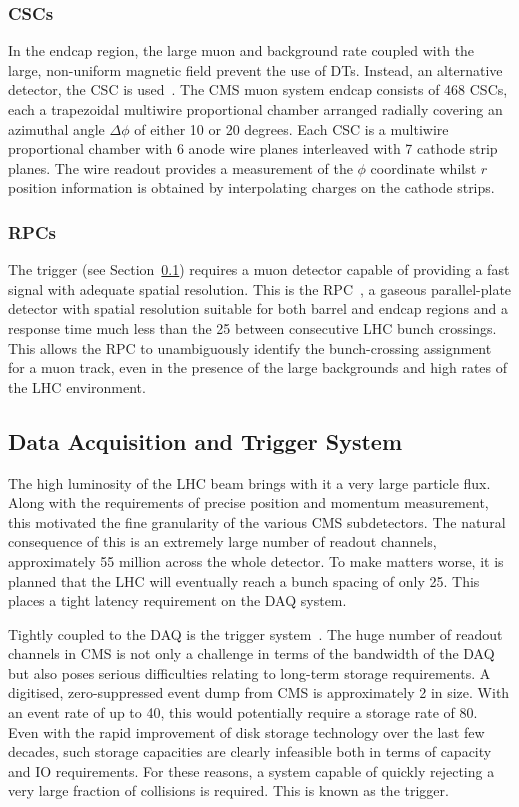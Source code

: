 \subsubsection{\aclp{CSC}}
In the endcap region, the large muon and background rate coupled with the large,
non-uniform magnetic field prevent the use of \acp{DT}. Instead, an alternative
detector, the \acf{CSC} is used~\cite{csc_paper}. The CMS muon system endcap
consists of 468 \acp{CSC}, each a trapezoidal multiwire proportional chamber
arranged radially covering an azimuthal angle $\Delta\phi$ of either 10 or 20
degrees. Each \ac{CSC} is a multiwire proportional chamber with 6 anode wire
planes interleaved with 7 cathode strip planes. The wire readout provides a
measurement of the $\phi$ coordinate whilst $r$ position information is obtained
by interpolating charges on the cathode strips.

\subsubsection{\aclp{RPC}}
The trigger (see Section~\ref{sec:trigger}) requires a muon detector capable of
providing a fast signal with adequate spatial resolution. This is the
\acf{RPC}~\cite{rpc_paper}, a gaseous parallel-plate detector with spatial
resolution suitable for both barrel and endcap regions and a response time much
less than the \unit{25}{\nano\second} between consecutive \ac{LHC} bunch
crossings. This allows the \ac{RPC} to unambiguously identify the bunch-crossing
assignment for a muon track, even in the presence of the large backgrounds and
high rates of the \ac{LHC} environment.

\subsection{Data Acquisition and Trigger System}
\label{sec:trigger}
The high luminosity of the \ac{LHC} beam brings with it a very large particle
flux. Along with the requirements of precise position and momentum measurement,
this motivated the fine granularity of the various \ac{CMS} subdetectors. The
natural consequence of this is an extremely large number of readout channels,
approximately 55 million across the whole detector. To make matters worse, it is
planned that the \ac{LHC} will eventually reach a bunch spacing of only
\unit{25}{\nano\second}. This places a tight latency requirement on the \ac{DAQ}
system.

Tightly coupled to the \ac{DAQ} is the trigger system~\cite{tridas}. The huge
number of readout channels in \ac{CMS} is not only a challenge in terms of the
bandwidth of the \ac{DAQ} but also poses serious difficulties relating to
long-term storage requirements. A digitised, zero-suppressed event dump from
\ac{CMS} is approximately \unit{2}{\mega\byte} in size. With an event rate of up
to \unit{40}{\mega\hertz}, this would potentially require a storage rate of
\unit{80}{\tera\byte\per\second}. Even with the rapid improvement of disk
storage technology over the last few decades, such storage capacities are
clearly infeasible both in terms of capacity and \ac{IO} requirements. For these
reasons, a system capable of quickly rejecting a very large fraction of
collisions is required. This is known as the trigger.

